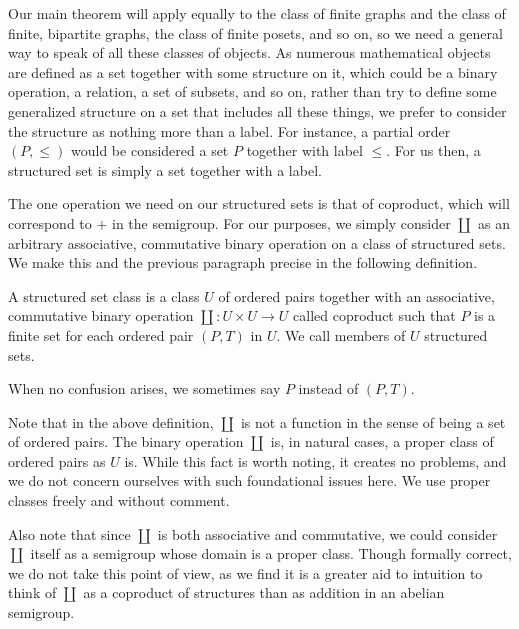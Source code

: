 \documentclass[review]{elsarticle}
\begin{document}
Our main theorem will apply equally to the class of finite graphs
and the class of finite, bipartite graphs, the class of finite
posets, and so on, so we need a general way to speak of all these
classes of objects. As numerous mathematical objects are defined
as a set together with some structure on it, which could be a binary
operation, a relation, a set of subsets, and so on, rather than
try to define some generalized structure on a set that includes all
these things, we prefer to consider the structure as nothing more than
a label. For instance, a partial order $(P,\le)$ would be considered
a set $P$ together with label $\le$. For us then, a structured set
is simply a set together with a label.

The one operation we need on our structured sets is that of coproduct,
which will correspond to $+$ in the semigroup.
For our purposes,
we simply consider $\coprod$ as an arbitrary associative, commutative
binary operation on a
class of structured sets. We make this and the previous paragraph
precise in the following definition.

\begin{dfn}
A structured set class is a class $U$ of ordered pairs
together with an associative, commutative binary operation
$\coprod:U\times U\to U$
called coproduct such that
$P$ is a finite set for each ordered pair $(P,T)$ in $U$.
We call members of $U$ structured sets. 
\end{dfn}

When no confusion arises,
we sometimes say $P$ instead of $(P,T)$.

Note that in the above definition, $\coprod$ is not a
function in the sense of being a set of ordered pairs. The
binary operation $\coprod$ is, in natural cases, a proper class of
ordered pairs as $U$ is. While this fact is worth noting,
it creates no problems, and we do not concern ourselves
with such foundational issues here. We use proper classes
freely and without comment.

Also note that since $\coprod$ is both associative and commutative,
we could consider $\coprod$ itself as a semigroup whose domain is
a proper class. Though formally correct, we do not take this point
of view, as we find it is a greater
aid to intuition to think of $\coprod$ as a coproduct of structures
than as addition in an abelian semigroup.
\end{document}
